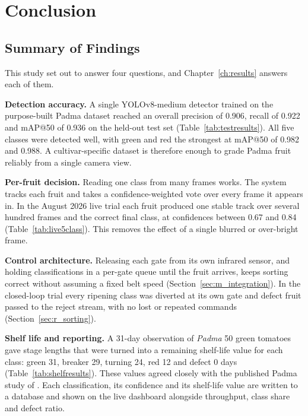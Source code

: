 \section{Conclusion}
\label{ch:conclusions}

\subsection{Summary of Findings}
\label{sec:c_summary}

This study set out to answer four questions, and Chapter~\ref{ch:results} answers each of them.

\textbf{Detection accuracy.} A single YOLOv8-medium detector trained on the purpose-built Padma dataset reached an overall precision of 0.906, recall of 0.922 and mAP@50 of 0.936 on the held-out test set (Table~\ref{tab:testresults}). All five classes were detected well, with green and red the strongest at mAP@50 of 0.982 and 0.988. A cultivar-specific dataset is therefore enough to grade Padma fruit reliably from a single camera view.

\textbf{Per-fruit decision.} Reading one class from many frames works. The system tracks each fruit and takes a confidence-weighted vote over every frame it appears in. In the August 2026 live trial each fruit produced one stable track over several hundred frames and the correct final class, at confidences between 0.67 and 0.84 (Table~\ref{tab:live5class}). This removes the effect of a single blurred or over-bright frame.

\textbf{Control architecture.} Releasing each gate from its own infrared sensor, and holding classifications in a per-gate queue until the fruit arrives, keeps sorting correct without assuming a fixed belt speed (Section~\ref{sec:m_integration}). In the closed-loop trial every ripening class was diverted at its own gate and defect fruit passed to the reject stream, with no lost or repeated commands (Section~\ref{sec:r_sorting}).

\textbf{Shelf life and reporting.} A 31-day observation of \textit{Padma} 50 green tomatoes gave stage lengths that were turned into a remaining shelf-life value for each class: green 31, breaker 29, turning 24, red 12 and defect 0 days (Table~\ref{tab:shelfresults}). These values agreed closely with the published Padma study of \citet{abekoon2024}. Each classification, its confidence and its shelf-life value are written to a database and shown on the live dashboard alongside throughput, class share and defect ratio.

